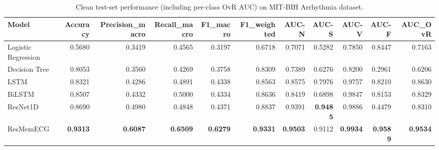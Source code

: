 \begin{table}[h!]
\centering
\caption{Clean test-set performance (including per-class OvR AUC) on MIT-BIH Arrhythmia dataset.}
\label{tab:clean_perf}
\begin{tabular}{lrrrrrrrrrr}
\toprule
Model & Accuracy & Precision_macro & Recall_macro & F1_macro & F1_weighted & AUC-N & AUC-S & AUC-V & AUC-F & AUC_OvR \\
\midrule
Logistic Regression & 0.5680 & 0.3419 & 0.4565 & 0.3197 & 0.6718 & 0.7071 & 0.5282 & 0.7850 & 0.8447 & 0.7163 \\
Decision Tree & 0.8053 & 0.3560 & 0.4269 & 0.3758 & 0.8309 & 0.7389 & 0.6276 & 0.8200 & 0.2961 & 0.6206 \\
LSTM & 0.8321 & 0.4286 & 0.4891 & 0.4338 & 0.8563 & 0.8575 & 0.7976 & 0.9757 & 0.8210 & 0.8630 \\
BiLSTM & 0.8507 & 0.4332 & 0.5000 & 0.4334 & 0.8636 & 0.8419 & 0.6898 & 0.9847 & 0.8153 & 0.8329 \\
ResNet1D & 0.8690 & 0.4980 & 0.4848 & 0.4371 & 0.8837 & 0.9391 & \textbf{0.9485} & 0.9886 & 0.4479 & 0.8310 \\
ResMemECG & \textbf{0.9313} & \textbf{0.6087} & \textbf{0.6509} & \textbf{0.6279} & \textbf{0.9331} & \textbf{0.9503} & 0.9112 & \textbf{0.9934} & \textbf{0.9589} & \textbf{0.9534} \\
\bottomrule
\end{tabular}
\end{table}